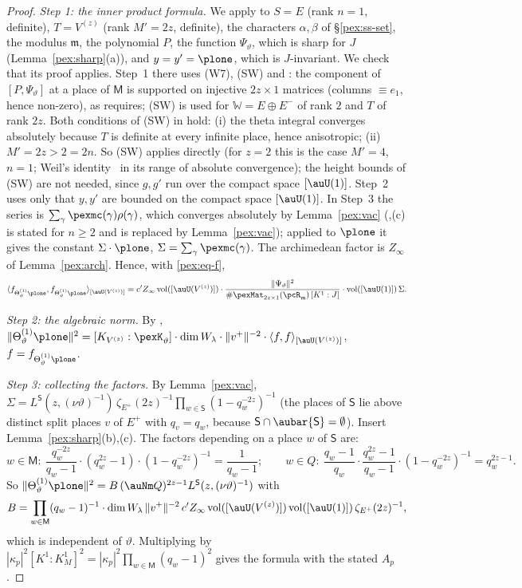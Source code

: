\documentclass[10pt]{amsart}
\theoremstyle{definition}
\theoremstyle{remark}
\providecommand{\pcW}{\mathbb W}
\begin{document}
\begin{proof}
\emph{Step 1: the inner product formula.} We apply {\cite[Proposition~2.16]{P53}} to $S=E$ (rank $n=1$,
definite), $T=V^{(z)}$ (rank $M'=2z$, definite), the characters $\alpha,\beta$ of
\S\ref{pex:ss-set}, the modulus $\mathfrak m$, the polynomial $P$, the function $\Psi_\vartheta$,
which is sharp for $J$ (Lemma~\ref{pex:sharp}(a)), and $y=y'=\plone$, which is $J$-invariant. We
check that its proof applies. Step~1 there uses (W7), (SW) and {\cite[Lemma~2.14]{P53}}: the component of
$[P,\Psi_\vartheta]$ at a place of $\mathsf M$ is supported on injective $2z\times1$ matrices
(columns $\equiv e_1$, hence non-zero), as {\cite[Lemma~2.14]{P53}} requires; (SW) is used for
$\pcW=E\oplus E^-$ of rank $2$ and $T$ of rank $2z$. Both conditions of (SW) in {\cite[Lemma~2.13]{P53}} hold: (i) the theta
integral converges absolutely because $T$ is definite at every infinite place, hence anisotropic; (ii)
$M'=2z>2=2n$. So (SW) applies directly (for $z=2$ this is the case $M'=4$, $n=1$; Weil's
identity~\cite[Th\'eor\`eme~5]{WeilSiegel} in its range of absolute convergence); the height bounds of (SW) are not needed, since $g,g'$ run over the compact space $[\auU(1)]$. Step~2 uses only that $y,y'$
are bounded on the compact space $[\auU(1)]$. In Step~3 the series is $\sum_\gamma\pexmc(\gamma)\rho
(\gamma)$, which converges absolutely by Lemma~\ref{pex:vac} ({\cite[Lemma~2.11(b)]{P53}},(c) is stated
for $n\ge2$ and is replaced by Lemma~\ref{pex:vac}); applied to $\plone$ it gives the constant
$\Sigma\cdot\plone$, $\Sigma=\sum_\gamma\pexmc(\gamma)$. The archimedean factor is $Z_\infty$ of
Lemma~\ref{pex:arch}. Hence, with \eqref{pex:eq-f},
\[
\langle f_{\Theta^{(1)}_\vartheta\plone},f_{\Theta^{(1)}_\vartheta\plone}\rangle_{[\auU(V^{(z)})]}
=c'Z_\infty\,\mathrm{vol}([\auU(V^{(z)})])\cdot\frac{\|\Psi_\vartheta\|^2}{\#\pexMat_{2z\times1}
(\pcR_{\mathfrak m})\,[K^1:J]}\cdot\mathrm{vol}([\auU(1)])\,\Sigma .
\]

\emph{Step 2: the algebraic norm.} By {\cite[Lemma~2.18]{P53}},
$\|\Theta^{(1)}_\vartheta\plone\|^2=[K_{V^{(z)}}:\pexK_\vartheta]\cdot\dim W_\lambda\cdot\|v^+\|^{-2}\cdot
\langle f,f\rangle_{[\auU(V^{(z)})]}$, $f=f_{\Theta^{(1)}_\vartheta\plone}$.

\emph{Step 3: collecting the factors.} By Lemma~\ref{pex:vac},
$\Sigma=L^{\mathsf S}(z,(\nu\vartheta)^{-1})\,\zeta_{E^+}(2z)^{-1}\prod_{w\in\mathsf S}(1-q_w^{-2z})^{-1}$
(the places of $\mathsf S$ lie above distinct split places $v$ of $E^+$ with $q_v=q_w$, because
$\mathsf S\cap\aubar{\mathsf S}=\emptyset$). Insert Lemma~\ref{pex:sharp}(b),(c). The factors
depending on a place $w$ of $\mathsf S$ are:
\[
w\in\mathsf M:\ \frac{q_w^{-2z}}{q_w-1}\cdot(q_w^{2z}-1)\cdot(1-q_w^{-2z})^{-1}=\frac1{q_w-1};\qquad
w\in Q:\ \frac{q_w-1}{q_w}\cdot\frac{q_w^{2z}-1}{q_w-1}\cdot(1-q_w^{-2z})^{-1}=q_w^{2z-1}.
\]
So $\|\Theta^{(1)}_\vartheta\plone\|^2=B\,(\auNm Q)^{2z-1}L^{\mathsf S}(z,(\nu\vartheta)^{-1})$ with
\[B=\prod_{w\in\mathsf M}(q_w-1)^{-1}\cdot\dim W_\lambda\,\|v^+\|^{-2}\,c'Z_\infty\,\mathrm{vol}([\auU(V^{(z)})])
\,\mathrm{vol}([\auU(1)])\,\zeta_{E^+}(2z)^{-1},\]
which is independent of $\vartheta$. Multiplying by
$|\kappa_p|^2[K^1:K^1_M]^2=|\kappa_p|^2\prod_{w\in\mathsf M}(q_w-1)^2$ gives the formula with the stated
$A_p$.


\end{proof}
\end{document}
